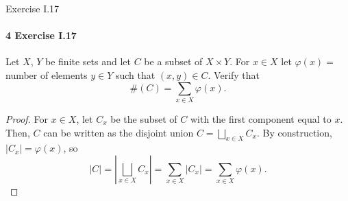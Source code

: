 \documentclass[12pt]{article}
\newlength{\myparskip}
\newenvironment{fullbox}{\begin{lrbox}{\savefullbox}\begin{minipage}{\dimexpr\textwidth-2\fboxsep\relax}\setlength{\parskip}{\myparskip}}{\end{minipage}\end{lrbox}\framebox[\textwidth]{\usebox{\savefullbox}}}
\newenvironment{pbox}[1][]{\begin{fullbox}\ifx#1\empty\else\paragraph{#1}\fi}{\end{fullbox}}
\renewcommand{\phi}{\varphi}
\newcommand{\<}{\langle}
\renewcommand{\>}{\rangle}
\theoremstyle{definition}
\begin{document}
\newpage
\begin{pbox}[4 Exercise I.17]
    Let $X$, $Y$ be finite sets and let $C$ be a subset of $X \times Y$. For $x \in X$ let $\phi(x) =$ number of elements $y \in Y$ such that $(x, y) \in C$. Verify that
    \[
        \#(C) = \sum_{x \in X} \phi(x). 
    \]
\end{pbox}

\begin{proof}
    For $x \in X$, let $C_x$ be the subset of $C$ with the first component equal to $x$. Then, $C$ can be written as the disjoint union $C = \bigsqcup_{x \in X} C_x$. By construction, $|C_x| = \phi(x)$, so
    \[
        |C|
            = \left| \bigsqcup_{x \in X} C_x \right|
            = \sum_{x \in X} |C_x|
            = \sum_{x \in X} \phi(x).
    \]

\end{proof}
\end{document}
